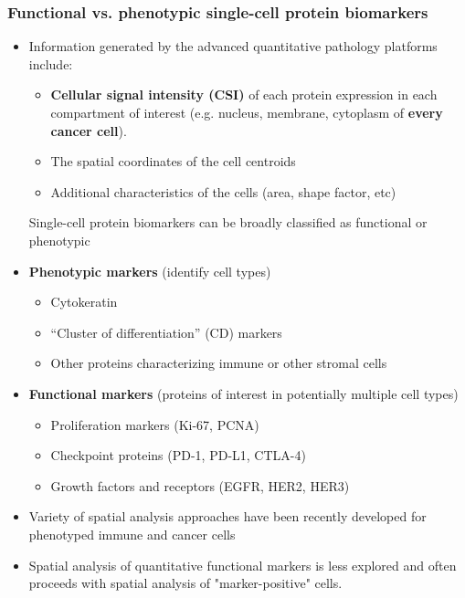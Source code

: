 \documentclass[t,8pt]{beamer}
\begin{document}
\frame
   {\frametitle{Functional vs. phenotypic single-cell protein biomarkers}  
   \begin{itemize} 
   	\item Information generated by the advanced quantitative pathology platforms include:		
	 \begin{itemize} 						
	      \item  \textbf{Cellular signal intensity (CSI)} of each protein expression in each compartment of interest (e.g. nucleus, membrane, cytoplasm of \textbf{every cancer cell}).
	      \item  The spatial coordinates of the cell centroids
	      \item Additional characteristics of the cells (area, shape factor, etc)
		\end{itemize}	
		    \color{red}  
 Single-cell protein biomarkers can be broadly classified as functional or phenotypic
  \color{black} 
        \item \textbf{Phenotypic markers} (identify cell types)
           \begin{itemize} 
             \item Cytokeratin
             \item “Cluster of differentiation” (CD) markers
             \item Other proteins characterizing immune or other stromal cells
           \end{itemize}           
   \item \textbf{Functional markers} (proteins of interest in potentially multiple cell types)
             \begin{itemize} 
              \item Proliferation markers (Ki-67, PCNA)
              \item Checkpoint proteins (PD-1, PD-L1, CTLA-4)
              \item Growth factors and receptors (EGFR, HER2, HER3)
         \end{itemize}               
   \item  Variety of spatial analysis approaches have been recently developed for phenotyped immune and cancer cells 
    \color{red}  
     \item Spatial analysis of quantitative functional markers is less explored and often proceeds with spatial analysis of "marker-positive" cells.                     
 \color{black}            
\end{itemize}
}
\end{document}
